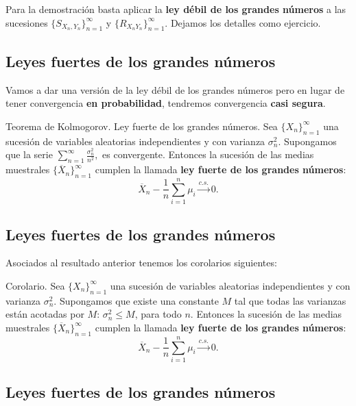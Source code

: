 \documentclass[]{book}
\begin{document}
Para la demostración basta aplicar la \textbf{ley débil de los grandes números} a las sucesiones \(\{S_{X_n,Y_n}\}_{n=1}^\infty\) y \(\{R_{X_nY_n}\}_{n=1}^\infty\). Dejamos los detalles como ejercicio.

\hypertarget{leyes-fuertes-de-los-grandes-nuxfameros}{%
\subsection{Leyes fuertes de los grandes números}\label{leyes-fuertes-de-los-grandes-nuxfameros}}

Vamos a dar una versión de la ley débil de los grandes números pero en lugar de tener convergencia \textbf{en probabilidad}, tendremos convergencia \textbf{casi segura}.

 Teorema de Kolmogorov. Ley fuerte de los grandes números.
Sea \(\{X_n\}_{n=1}^\infty\) una sucesión de variables aleatorias independientes y con varianza \(\sigma_n^2\). Supongamos que la serie
\(\sum\limits_{n=1}^\infty \frac{\sigma_n^2}{n^2},\)
es convergente. Entonces la sucesión de las medias muestrales \(\{\overline{X}_n\}_{n=1}^\infty\) cumplen la
llamada \textbf{ley fuerte de los grandes números}:
\[
\overline{X}_n-\frac{1}{n}\sum_{i=1}^n \mu_i \stackrel{c.s.}{\longrightarrow} 0.
\]

\hypertarget{leyes-fuertes-de-los-grandes-nuxfameros-1}{%
\subsection{Leyes fuertes de los grandes números}\label{leyes-fuertes-de-los-grandes-nuxfameros-1}}

Asociados al resultado anterior tenemos los corolarios siguientes:

 Corolario.
Sea \(\{X_n\}_{n=1}^\infty\) una sucesión de variables aleatorias independientes y con varianza \(\sigma_n^2\). Supongamos que existe una constante \(M\) tal que todas las varianzas están acotadas por \(M\): \(\sigma_n^2\leq M\), para todo \(n\).
Entonces la sucesión de las medias muestrales \(\{\overline{X}_n\}_{n=1}^\infty\) cumplen la
llamada \textbf{ley fuerte de los grandes números}:
\[
\overline{X}_n-\frac{1}{n}\sum_{i=1}^n \mu_i \stackrel{c.s.}{\longrightarrow} 0.
\]

\hypertarget{leyes-fuertes-de-los-grandes-nuxfameros-2}{%
\subsection{Leyes fuertes de los grandes números}\label{leyes-fuertes-de-los-grandes-nuxfameros-2}}
\end{document}

